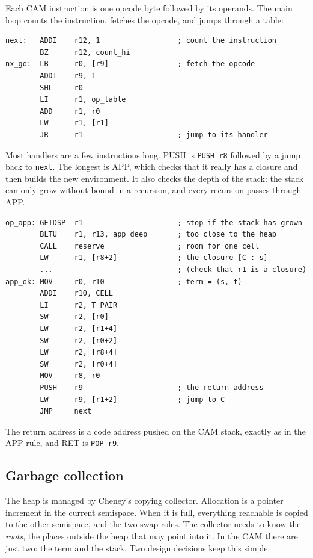 \documentclass[11pt,a4paper]{article}
\newcommand{\ins}[1]{\textsf{#1}}
\theoremstyle{definition}
\theoremstyle{plain}
\begin{document}
Each CAM instruction is one opcode byte followed by its operands. The main
loop counts the instruction, fetches the opcode, and jumps through a table:
\begin{lstlisting}
next:   ADDI    r12, 1                  ; count the instruction
        BZ      r12, count_hi
nx_go:  LB      r0, [r9]                ; fetch the opcode
        ADDI    r9, 1
        SHL     r0
        LI      r1, op_table
        ADD     r1, r0
        LW      r1, [r1]
        JR      r1                      ; jump to its handler
\end{lstlisting}
Most handlers are a few instructions long. \ins{PUSH} is \texttt{PUSH r8}
followed by a jump back to \texttt{next}. The longest is \ins{APP}, which
checks that it really has a closure and then builds the new environment. It
also checks the depth of the stack: the stack can only grow without bound in
a recursion, and every recursion passes through \ins{APP}.
\begin{lstlisting}
op_app: GETDSP  r1                      ; stop if the stack has grown
        BLTU    r1, r13, app_deep       ; too close to the heap
        CALL    reserve                 ; room for one cell
        LW      r1, [r8+2]              ; the closure [C : s]
        ...                             ; (check that r1 is a closure)
app_ok: MOV     r0, r10                 ; term = (s, t)
        ADDI    r10, CELL
        LI      r2, T_PAIR
        SW      r2, [r0]
        LW      r2, [r1+4]
        SW      r2, [r0+2]
        LW      r2, [r8+4]
        SW      r2, [r0+4]
        MOV     r8, r0
        PUSH    r9                      ; the return address
        LW      r9, [r1+2]              ; jump to C
        JMP     next
\end{lstlisting}
The return address is a code address pushed on the CAM stack, exactly as in
the \ins{APP} rule, and \ins{RET} is \texttt{POP r9}.

\subsection{Garbage collection}

The heap is managed by Cheney's copying collector. Allocation is a pointer
increment in the current semispace. When it is full, everything reachable is
copied to the other semispace, and the two swap roles. The collector needs to
know the \emph{roots}, the places outside the heap that may point into it.
In the CAM there are just two: the term and the stack. Two design decisions
keep this simple.
\end{document}
